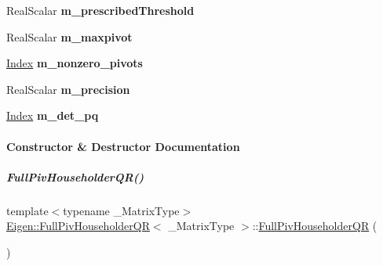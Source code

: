 \begin{DoxyCompactItemize}
Real\+Scalar {\bfseries m\+\_\+prescribed\+Threshold}
\item 
\mbox{\label{group___q_r___module_a44d0682e4e2f99fa5319304598f7724b}} 
Real\+Scalar {\bfseries m\+\_\+maxpivot}
\item 
\mbox{\label{group___q_r___module_ad5e3bdbf5f2da0a0e2e8a4482fbcdf1e}} 
\hyperlink{namespace_eigen_a62e77e0933482dafde8fe197d9a2cfde}{Index} {\bfseries m\+\_\+nonzero\+\_\+pivots}
\item 
\mbox{\label{group___q_r___module_a5e27bd23c1aa3208080354c357309d7e}} 
Real\+Scalar {\bfseries m\+\_\+precision}
\item 
\mbox{\label{group___q_r___module_a6fa460d74c719fed08d8c574ec13d41d}} 
\hyperlink{namespace_eigen_a62e77e0933482dafde8fe197d9a2cfde}{Index} {\bfseries m\+\_\+det\+\_\+pq}
\end{DoxyCompactItemize}


\paragraph{Constructor \& Destructor Documentation}
\mbox{\label{group___q_r___module_aeb14b4c1eef33128207b40a00bd0bd08}} 
\subparagraph{\texorpdfstring{Full\+Piv\+Householder\+Q\+R()}{FullPivHouseholderQR()}\hspace{0.1cm}{\footnotesize\ttfamily [1/8]}}
{\footnotesize\ttfamily template$<$typename \+\_\+\+Matrix\+Type$>$ \\
\hyperlink{group___q_r___module_class_eigen_1_1_full_piv_householder_q_r}{Eigen\+::\+Full\+Piv\+Householder\+QR}$<$ \+\_\+\+Matrix\+Type $>$\+::\hyperlink{group___q_r___module_class_eigen_1_1_full_piv_householder_q_r}{Full\+Piv\+Householder\+QR} (\begin{DoxyParamCaption}{ }\end{DoxyParamCaption})\hspace{0.3cm}{\ttfamily [inline]}}



